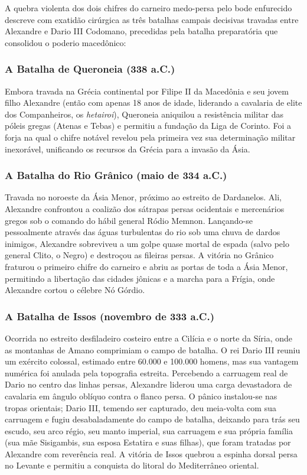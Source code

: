 \documentclass[11pt,a4paper,openany]{book}
\begin{document}
A quebra violenta dos dois chifres do carneiro medo-persa pelo bode enfurecido descreve com exatidão cirúrgica as três batalhas campais decisivas travadas entre Alexandre e Dario III Codomano, precedidas pela batalha preparatória que consolidou o poderio macedônico:


\subsubsection*{A Batalha de Queroneia (338 a.C.)}
Embora travada na Grécia continental por Filipe II da Macedônia e seu jovem filho Alexandre (então com apenas 18 anos de idade, liderando a cavalaria de elite dos Companheiros, os \textit{hetairoi}), Queroneia aniquilou a resistência militar das póleis gregas (Atenas e Tebas) e permitiu a fundação da Liga de Corinto. Foi a forja na qual o chifre notável revelou pela primeira vez sua determinação militar inexorável, unificando os recursos da Grécia para a invasão da Ásia.


\subsubsection*{A Batalha do Rio Grânico (maio de 334 a.C.)}
Travada no noroeste da Ásia Menor, próximo ao estreito de Dardanelos. Ali, Alexandre confrontou a coalizão dos sátrapas persas ocidentais e mercenários gregos sob o comando do hábil general Ródio Memnon. Lançando-se pessoalmente através das águas turbulentas do rio sob uma chuva de dardos inimigos, Alexandre sobreviveu a um golpe quase mortal de espada (salvo pelo general Clito, o Negro) e destroçou as fileiras persas. A vitória no Grânico fraturou o primeiro chifre do carneiro e abriu as portas de toda a Ásia Menor, permitindo a libertação das cidades jônicas e a marcha para a Frígia, onde Alexandre cortou o célebre Nó Górdio.


\subsubsection*{A Batalha de Issos (novembro de 333 a.C.)}
Ocorrida no estreito desfiladeiro costeiro entre a Cilícia e o norte da Síria, onde as montanhas de Amano comprimiam o campo de batalha. O rei Dario III reuniu um exército colossal, estimado entre 60.000 e 100.000 homens, mas sua vantagem numérica foi anulada pela topografia estreita. Percebendo a carruagem real de Dario no centro das linhas persas, Alexandre liderou uma carga devastadora de cavalaria em ângulo oblíquo contra o flanco persa. O pânico instalou-se nas tropas orientais; Dario III, temendo ser capturado, deu meia-volta com sua carruagem e fugiu desabaladamente do campo de batalha, deixando para trás seu escudo, seu arco régio, seu manto imperial, sua carruagem e sua própria família (sua mãe Sisigambis, sua esposa Estatira e suas filhas), que foram tratadas por Alexandre com reverência real. A vitória de Issos quebrou a espinha dorsal persa no Levante e permitiu a conquista do litoral do Mediterrâneo oriental.
\end{document}
